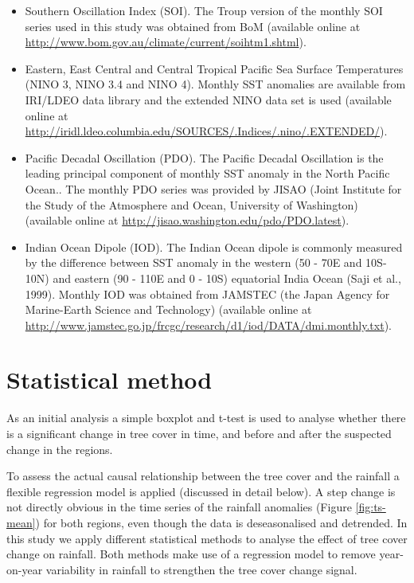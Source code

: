 \documentclass[fleqn,10pt,lineno]{wlpeerj} %
\providecommand{\tightlist}{
\setlength{\itemsep}{0pt}\setlength{\parskip}{0pt}}
\theoremstyle{definition}
\theoremstyle{definition}
\theoremstyle{definition}
\theoremstyle{remark}
\begin{document}
\begin{itemize}
\tightlist
\item
  Southern Oscillation Index (SOI). The Troup version of the monthly SOI
  series used in this study was obtained from BoM (available online at
  \url{http://www.bom.gov.au/climate/current/soihtm1.shtml}).\\
\item
  Eastern, East Central and Central Tropical Pacific Sea Surface
  Temperatures (NINO 3, NINO 3.4 and NINO 4). Monthly SST anomalies are
  available from IRI/LDEO data library and the extended NINO data set is
  used (available online at
  \url{http://iridl.ldeo.columbia.edu/SOURCES/.Indices/.nino/.EXTENDED/}).\\
\item
  Pacific Decadal Oscillation (PDO). The Pacific Decadal Oscillation is
  the leading principal component of monthly SST anomaly in the North
  Pacific Ocean.. The monthly PDO series was provided by JISAO (Joint
  Institute for the Study of the Atmosphere and Ocean, University of
  Washington) (available online at
  \url{http://jisao.washington.edu/pdo/PDO.latest}).\\
\item
  Indian Ocean Dipole (IOD). The Indian Ocean dipole is commonly
  measured by the difference between SST anomaly in the western (50 -
  70\textdegree E and 10\textdegree S-10\textdegree N) and eastern (90 -
  110\textdegree E and 0 - 10\textdegree S) equatorial India Ocean (Saji
  et al., 1999). Monthly IOD was obtained from JAMSTEC (the Japan Agency
  for Marine-Earth Science and Technology) (available online at
  \url{http://www.jamstec.go.jp/frcgc/research/d1/iod/DATA/dmi.monthly.txt}).
\end{itemize}

\section{Statistical method}\label{statistical-method}

As an initial analysis a simple boxplot and t-test is used to analyse
whether there is a significant change in tree cover in time, and before
and after the suspected change in the regions.

To assess the actual causal relationship between the tree cover and the
rainfall a flexible regression model is applied (discussed in detail
below). A step change is not directly obvious in the time series of the
rainfall anomalies (Figure \ref{fig:ts-mean}) for both regions, even
though the data is deseasonalised and detrended. In this study we apply
different statistical methods to analyse the effect of tree cover change
on rainfall. Both methods make use of a regression model to remove
year-on-year variability in rainfall to strengthen the tree cover change
signal.
\end{document}
